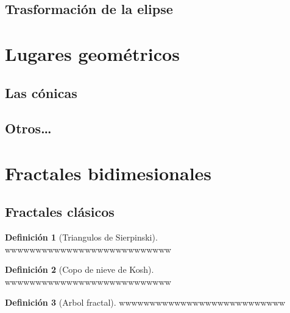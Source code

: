 \documentclass[
  16pt,
]{krantz}
\theoremstyle{definition}
\newtheorem{definition}{Definición}[chapter]
\theoremstyle{definition}
\theoremstyle{definition}
\theoremstyle{definition}
\theoremstyle{remark}
\begin{document}
\hypertarget{trasformaciuxf3n-de-la-elipse}{%
\subsection{Trasformación de la elipse}\label{trasformaciuxf3n-de-la-elipse}}

\hypertarget{lugares-geomuxe9tricos}{%
\section{Lugares geométricos}\label{lugares-geomuxe9tricos}}

\hypertarget{las-cuxf3nicas}{%
\subsection{Las cónicas}\label{las-cuxf3nicas}}

\hypertarget{otros}{%
\subsection{Otros\ldots{}}\label{otros}}

\hypertarget{fractales-bidimesionales}{%
\section{Fractales bidimesionales}\label{fractales-bidimesionales}}

\hypertarget{fractales-cluxe1sicos}{%
\subsection{Fractales clásicos}\label{fractales-cluxe1sicos}}

\begin{definition}[Triangulos de Sierpinski]
\protect\hypertarget{def:sierpinski}{}{\label{def:sierpinski} {} }wwwwwwwwwwwwwwwwwwwwwwwwwww
\end{definition}

\begin{definition}[Copo de nieve de Kosh]
\protect\hypertarget{def:kosh}{}{\label{def:kosh} {} }wwwwwwwwwwwwwwwwwwwwwwwwwww
\end{definition}

\begin{definition}[Arbol fractal]
\protect\hypertarget{def:arbol}{}{\label{def:arbol} {} }wwwwwwwwwwwwwwwwwwwwwwwwwww
\end{definition}
\end{document}
